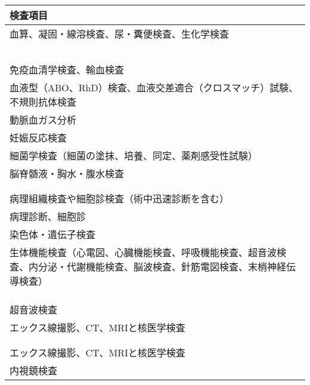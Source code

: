\begin{xltabular}{\linewidth}{X}
\caption{\label{tbl:主要な臨床検査}} \\
\toprule
検査項目 \\
\midrule
\endhead
血算、凝固・線溶検査、尿・糞便検査、生化学検査 \\
 \\
 \\
 \\
 \\
 \\
免疫血清学検査、輸血検査 \\
血液型（ABO、RhD）検査、血液交差適合（クロスマッチ）試験、不規則抗体検査 \\
動脈血ガス分析 \\
妊娠反応検査 \\
細菌学検査（細菌の塗抹、培養、同定、薬剤感受性試験） \\
脳脊髄液・胸水・腹水検査 \\
 \\
 \\
病理組織検査や細胞診検査（術中迅速診断を含む） \\
病理診断、細胞診 \\
染色体・遺伝子検査 \\
生体機能検査（心電図、心臓機能検査、呼吸機能検査、超音波検査、内分泌・代謝機能検査、脳波検査、針筋電図検査、末梢神経伝導検査） \\
 \\
 \\
 \\
超音波検査 \\
エックス線撮影、CT、MRIと核医学検査 \\
 \\
 \\
エックス線撮影、CT、MRIと核医学検査 \\
内視鏡検査 \\
\bottomrule
\end{xltabular}



